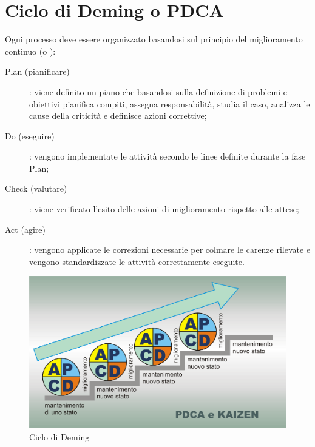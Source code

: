 \documentclass[PianoDiQualifica.tex]{subfiles}
\begin{document}
		
\chapter{Ciclo di Deming o PDCA}
Ogni processo deve essere organizzato basandosi sul principio del miglioramento continuo (o ):
\begin{description}
	\item [Plan (pianificare)]: viene definito un piano che basandosi sulla definizione di problemi e obiettivi pianifica compiti, assegna responsabilità, studia il caso, analizza le cause della criticità e definisce azioni correttive; 
	\item [Do (eseguire)]: vengono implementate le attività secondo le linee definite durante la fase Plan;
	\item [Check (valutare)]: viene verificato l'esito delle azioni di miglioramento rispetto alle attese;
	\item [Act (agire)]: vengono applicate le correzioni necessarie per colmare le carenze rilevate e vengono standardizzate le attività correttamente eseguite.
\end{description}

\begin{figure}[htbp]
	\begin{center}
		\includegraphics[width=0.7\linewidth]{PDCAkaizen}
		\caption[Ciclo di Deming]{Ciclo di Deming}
		\label{fig:pdca}
	\end{center}
\end{figure}
\end{document}
